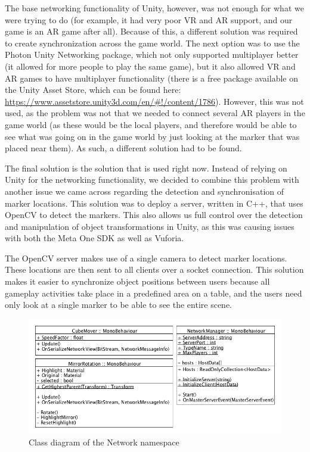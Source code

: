 			The base networking functionality of Unity, however, was not enough
			for what we were trying to do (for example, it had very poor VR and
			AR support, and our game is an AR game after all). Because of this,
			a different solution was required to create synchronization across
			the game world. The next option was to use the Photon Unity Networking
			package, which not only supported multiplayer better (it allowed for
			more people to play the same game), but it also allowed VR and AR games
			to have multiplayer functionality (there is a free package available
			on the Unity Asset Store, which can be found here: \url{https://www.assetstore.unity3d.com/en/#!/content/1786}). However,
			this was not used, as the problem was not that we needed to connect
			several AR players in the game world (as these would be the local players,
			and therefore would be able to see what was going on in the game world
			by just looking at the marker that was placed near them). As such,
			a different solution had to be found.
			
			The final solution is the solution that is used right now. Instead of 
			relying on Unity for the networking functionality, we decided to 
			combine this problem with another issue we came across regarding 
			the detection and synchronisation of marker locations. This solution
			was to deploy a server, written in C++, that uses OpenCV to detect 
			the markers. This also allows us full control over the detection and 
			manipulation of object transformations in Unity, as this was causing 
			issues with both the Meta One SDK as well as Vuforia.
			
			The OpenCV server makes use of a single camera to detect marker locations.
			These locations are then sent to all clients over a socket connection.
			This solution makes it easier to synchronize object positions between users
			because all gameplay activities take place in a predefined area on a table,
			and the users need only look at a single marker to be able to see the 
			entire scene. 
			
			\begin{figure}[ht]
				\includegraphics[width=\textwidth]{ClassDiagramNetwork}
				\caption{Class diagram of the Network namespace}
				\label{fig:classdiagramnetwork}
			\end{figure}
			
